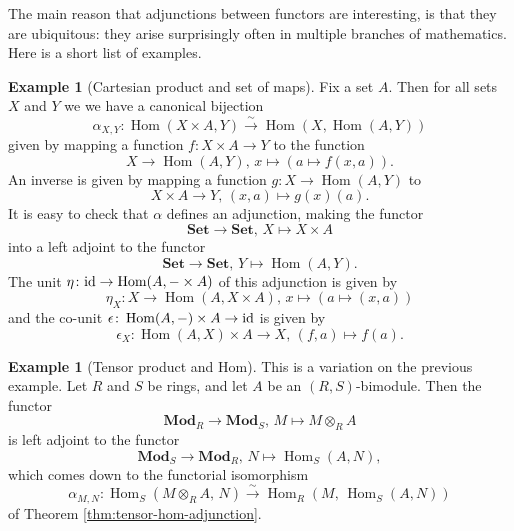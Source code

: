 \documentclass[11pt]{amsbook}
\newcommand{\isomto}{\overset{\sim}{\to}}
\newcommand{\longisomto}{\overset{\sim}{\longrightarrow}}
\DeclareMathOperator\Hom{Hom}
\DeclareMathOperator\Mod{{\bf{Mod}}}
\def\id{{\rm id}}
\def\Set{\mathbf{Set}}
\def\Mod{\mathbf{Mod}}
\theoremstyle{plain}
\theoremstyle{definition}
\newtheorem{example}[theorem]{Example}
\begin{document}
The main reason that adjunctions between functors are interesting, is that they are ubiquitous: they arise surprisingly often in multiple branches of mathematics. Here is a short list of examples.

\begin{example}[Cartesian product and set of maps]
Fix a set $A$. Then for all sets $X$ and $Y$ we we have a canonical bijection
\[
	\alpha_{X,Y}\colon \Hom(X\times A, Y ) \isomto \Hom(X, \Hom(A,Y))
\]
given  by mapping a function $f\colon X\times A \to Y$ to the function
\[
	X \to \Hom(A,Y),\, x \mapsto \left( a \mapsto f(x,a) \right).
\]
An inverse is given by mapping a function $g\colon X\to \Hom(A,Y)$ to
\[
	X\times A\to Y,\, (x,a) \mapsto g(x)(a).
\]
It is easy to check that $\alpha$ defines an adjunction, making the functor
\[
	\Set \to \Set,\,X \mapsto X \times A
\]
into a left adjoint to the functor
\[
	\Set \to \Set,\, Y \mapsto \Hom(A,Y).
\]
The unit $\eta\colon \id \to \Hom(A,-\times A)$ of this adjunction is given by
\[
	\eta_X \colon X \to \Hom(A,X\times A),\, x \mapsto \left( a \mapsto (x,a) \right)
\]
and the co-unit $\epsilon\colon \Hom(A,-)\times A\to \id$ is given by
\[
	\epsilon_X \colon \Hom(A,X)\times A \to X,\, (f,a) \mapsto f(a).
\]
\end{example}

\begin{example}[Tensor product and Hom]
This is a variation on the previous example. Let $R$ and $S$ be rings, and let  $A$ be an $(R,S)$-bimodule. Then the functor
\[
	\Mod_{R} \to \Mod_S,\, M \mapsto  M \otimes_R A
\]
is left adjoint to the functor
\[
	\Mod_S \to \Mod_R,\, N \mapsto \Hom_S(A,N),
\]
which comes down to the functorial isomorphism
\[
	\alpha_{M,N}\colon \Hom_S( M \otimes_R A,\, N ) \longisomto \Hom_R( M,\, \Hom_S(A,N) )
\]
of Theorem \ref{thm:tensor-hom-adjunction}.
\end{example}
\end{document}
